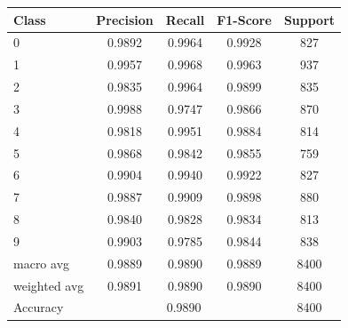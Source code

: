 \begin{tabular}{lcccc}
\toprule
Class & Precision & Recall & F1-Score & Support \\
\midrule
  0 & 0.9892 & 0.9964 & 0.9928 & 827 \\
  1 & 0.9957 & 0.9968 & 0.9963 & 937 \\
  2 & 0.9835 & 0.9964 & 0.9899 & 835 \\
  3 & 0.9988 & 0.9747 & 0.9866 & 870 \\
  4 & 0.9818 & 0.9951 & 0.9884 & 814 \\
  5 & 0.9868 & 0.9842 & 0.9855 & 759 \\
  6 & 0.9904 & 0.9940 & 0.9922 & 827 \\
  7 & 0.9887 & 0.9909 & 0.9898 & 880 \\
  8 & 0.9840 & 0.9828 & 0.9834 & 813 \\
  9 & 0.9903 & 0.9785 & 0.9844 & 838 \\
\midrule
  macro avg & 0.9889 & 0.9890 & 0.9889 & 8400 \\
  weighted avg & 0.9891 & 0.9890 & 0.9890 & 8400 \\
\midrule
  Accuracy & \multicolumn{3}{c}{0.9890} & 8400 \\
\bottomrule
\end{tabular}